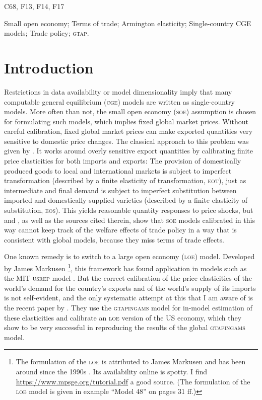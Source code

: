 \documentclass{jgea}
\newcommand{\CGE}{\textsc{cge}\xspace}
\newcommand{\SOE}{\textsc{soe}\xspace}
\newcommand{\LOE}{\textsc{loe}\xspace}
\newcommand{\EOS}{\textsc{eos}\xspace}
\newcommand{\EOT}{\textsc{eot}\xspace}
\newcommand{\GTAP}{\textsc{gtap}\xspace}
\newcommand{\GTAPINGAMS}{\textsc{gtapingams}\xspace}
\begin{document}
\begin{jelcodes}
C68, F13, F14, F17
\end{jelcodes}

\begin{keywords}
Small open economy; Terms of trade; Armington elasticity; Single-country CGE models; Trade policy; \GTAP.
\end{keywords}

\section{Introduction}\label{sec:intro}

Restrictions in data availability or model dimensionality imply that many computable general equilibrium (\CGE) models are written as single-country models.
More often than not, the small open economy (\SOE) assumption is chosen for formulating such models, which implies fixed global market prices.
Without careful calibration, fixed global market prices can make exported quantities very sensitive to domestic price changes.
The classical approach to this problem was given by \citet{DeMeloRobinson1989}.
It works around overly sensitive export quantities by calibrating finite price elasticities for both imports and exports:
The provision of domestically produced goods to local and international markets is subject to imperfect transformation (described by a finite elasticity of transformation, \EOT), just as intermediate and final demand is subject to imperfect substitution between imported and domestically supplied varieties (described by a finite elasticity of substitution, \EOS).
This yields reasonable quantity responses to price shocks, but \citet{LanzRutherford2016} and \citet{Schreiber2024}, as well as the sources cited therein, show that \SOE models calibrated in this way cannot keep track of the welfare effects of trade policy in a way that is consistent with global models, because they miss terms of trade effects.

One known remedy is to switch to a large open economy (\LOE) model.
Developed by James Markusen \citep{Markusen}\footnote{%
  The formulation of the \LOE is attributed to James Markusen and has been around since the 1990s \citep{Schreiber2024}.
  Its availability online is spotty.
  I find \url{https://www.mpsge.org/tutorial.pdf} a good source.
  (The formulation of the \LOE model is given in example ``Model 48'' on pages 31 ff.)
}, this framework has found application in models such as the MIT \textsc{usrep} model \citep{Yuan2019}.
But the correct calibration of the price elasticities of the world's demand for the country's exports and of the world's supply of its imports is not self-evident, and the only systematic attempt at this that I am aware of is the recent paper by \citet{Schreiber2024}.
They use the \GTAPINGAMS model for in-model estimation of these elasticities and calibrate an \LOE version of the US economy, which they show to be very successful in reproducing the results of the global \GTAPINGAMS model.
\end{document}
